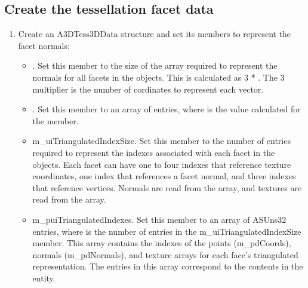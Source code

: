 \documentclass[letterpaper,12pt,english,openany,oneside]{sphinxmanual}
\begin{document}
\begin{sphinxVerbatim}[commandchars=\\\{\}]
\PYG{p}{[}\PYG{p}{]}  
\PYG{p}{[}\PYG{p}{]}  
\PYG{p}{[}\PYG{p}{]}  
\end{sphinxVerbatim}


\subsection{Create the tessellation facet data}
\label{\detokenize{Plugins_A3D_API:create-the-tessellation-facet-data}}\begin{enumerate}
%
\item {} 
Create an A3DTess3DData structure and set its members to represent the facet normals:
\begin{itemize}
\item {} 
. Set this member to the size of the array required to represent the normals for all facets in the objects. This is calculated as 3 * . The 3 multiplier is the number of cordinates to represent each vector.

\item {} 
. Set this member to an array of   entries, where  is the value calculated for the  member.

\item {} 
m\_uiTriangulatedIndexSize. Set this member to the number of entries required to represent the indexes associated with each facet in the objects. Each facet can have one to four indexes that reference texture coordinates, one index that references a facet normal, and three indexes that reference vertices. Normals are read from the  array, and textures are read from the  array.

\item {} 
m\_puiTriangulatedIndexes. Set this member to an array of  ASUns32 entries, where  is the number of entries in the m\_uiTriangulatedIndexSize member. This array contains the indexes of the points (m\_pdCoords), normals (m\_pdNormals), and texture arrays for each face’s triangulated representation. The entries in this array correspond to the contents in the  entity.

\end{itemize}

\end{enumerate}
\end{document}
